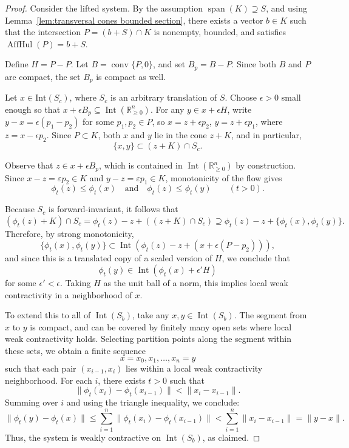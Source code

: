 \documentclass{article}
\begin{document}
\begin{proof}
Consider the lifted system. By the assumption \( \operatorname{span}(K) \supseteq S \), and using Lemma~\ref{lem:transversal cones bounded section}, there exists a vector \( b \in K \) such that the intersection \( P = (b + S) \cap K \) is nonempty, bounded, and satisfies \( \operatorname{AffHul}(P) = b + S \).

Define \( H = P - P \). Let \( B = \operatorname{conv}\{P, 0\} \), and set \( B_p = B - P \). Since both \( B \) and \( P \) are compact, the set \( B_p \) is compact as well.

Let \( x \in \mbox{Int}(S_c) \), where \( S_c \) is an arbitrary translation of \( S \). Choose \( \epsilon > 0 \) small enough so that \( x + \epsilon B_p \subseteq \operatorname{Int}(\mathbb{R}^n_{\geq 0}) \). For any \( y \in x + \epsilon H \), write \( y - x = \epsilon(p_1 - p_2) \) for some \( p_1, p_2 \in P \), so \( x = z + \epsilon p_2 \), \( y = z + \epsilon p_1 \), where \( z = x - \epsilon p_2 \). Since \( P \subset K \), both \( x \) and \( y \) lie in the cone \( z + K \), and in particular,
\[
\{x, y\} \subset (z + K) \cap S_c.
\]

Observe that \(z \in  x + \epsilon B_p \), which is contained in \( \operatorname{Int}(\mathbb{R}^n_{\geq 0})\) by construction. Since \(x-z=\varepsilon p_2\in K\) and \(y-z=\varepsilon p_1\in K\), monotonicity of the flow gives
\[
  \phi_t(z)\le\phi_t(x)\quad\text{and}\quad
  \phi_t(z)\le\phi_t(y)\qquad(t>0).
\]



Because \( S_c \) is forward-invariant, it follows that
\[
(\phi_t(z) + K) \cap S_c = \phi_t(z) - z + ((z + K) \cap S_c) \supseteq \phi_t(z) - z + \{\phi_t(x), \phi_t(y)\}.
\]
Therefore, by strong monotonicity, 
\[
\{\phi_t(x), \phi_t(y)\} \subset \operatorname{Int}(\phi_t(z) - z + (x + \epsilon(P - p_2))),
\]
and since this is a translated copy of a scaled version of \( H \), we conclude that
\[
\phi_t(y) \in \operatorname{Int}(\phi_t(x) + \epsilon' H)
\]
for some \( \epsilon' < \epsilon \). Taking \( H \) as the unit ball of a norm, this implies local weak contractivity in a neighborhood of \( x \).

To extend this to all of \( \operatorname{Int}(S_b) \), take any \( x, y \in \operatorname{Int}(S_b) \). The segment from \( x \) to \( y \) is compact, and can be covered by finitely many open sets where local weak contractivity holds. Selecting partition points along the segment within these sets, we obtain a finite sequence
\[
x = x_0, x_1, \dots, x_n = y
\]
such that each pair \( (x_{i-1}, x_i) \) lies within a local weak contractivity neighborhood. For each \( i \), there exists \( t > 0 \) such that
\[
\|\phi_t(x_i) - \phi_t(x_{i-1})\| < \|x_i - x_{i-1}\|.
\]
Summing over \( i \) and using the triangle inequality, we conclude:
\[
\|\phi_t(y) - \phi_t(x)\| \leq \sum_{i=1}^n \|\phi_t(x_i) - \phi_t(x_{i-1})\| < \sum_{i=1}^n \|x_i - x_{i-1}\| = \|y - x\|.
\]
Thus, the system is weakly contractive on \( \operatorname{Int}(S_b) \), as claimed.  
\end{proof}
\end{document}
